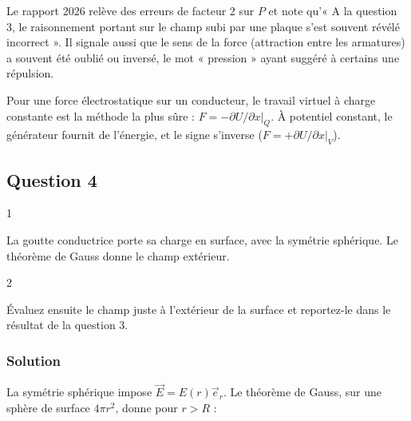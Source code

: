 \documentclass[11pt,a4paper]{article}
\newcommand{\equationajustee}[1]{%
  \sbox{\boiteequation}{$\displaystyle #1$}%
  \ifdim\wd\boiteequation>\linewidth
    \[\resizebox{\linewidth}{!}{\usebox{\boiteequation}}\]%
  \else
    \[#1\]%
  \fi}
\begin{document}
\begin{jury}

Le rapport 2026 relève des erreurs de facteur 2 sur \(P\) et note qu'« A la question 3, le raisonnement portant sur le champ subi par une plaque s'est souvent révélé incorrect ». Il signale aussi que le sens de la force (attraction entre les armatures) a souvent été oublié ou inversé, le mot « pression » ayant suggéré à certains une répulsion.

\end{jury}

\begin{methode}

Pour une force électrostatique sur un conducteur, le travail virtuel à charge constante est la méthode la plus sûre : \(F=-\partial U/\partial x|_Q\). À potentiel constant, le générateur fournit de l'énergie, et le signe s'inverse (\(F=+\partial U/\partial x|_V\)).

\end{methode}

\hypertarget{question-4}{%
\subsection{Question 4}\label{question-4}}

\begin{indication}{1}

La goutte conductrice porte sa charge en surface, avec la symétrie sphérique. Le théorème de Gauss donne le champ extérieur.

\end{indication}

\begin{indication}{2}

Évaluez ensuite le champ juste à l'extérieur de la surface et reportez-le dans le résultat de la question 3.

\end{indication}

\hypertarget{solution-3}{%
\subsubsection{Solution}\label{solution-3}}

La symétrie sphérique impose \(\vec E=E(r)\vec e_r\). Le théorème de Gauss, sur une sphère de surface \(4\pi r^2\), donne pour \(r>R\) :

\equationajustee{\vec E=\frac{Q}{4\pi\varepsilon_0r^2}\vec e_r .}
\end{document}
